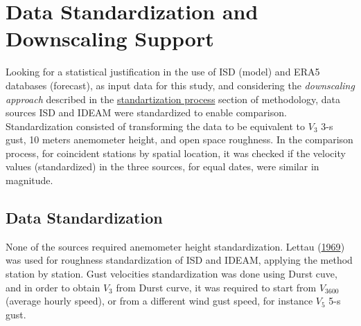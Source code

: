 \documentclass[12pt,oneside]{reedthesis}
\begin{document}
\hypertarget{data-standardization-and-downscaling-support}{%
\section{Data Standardization and Downscaling Support}\label{data-standardization-and-downscaling-support}}

Looking for a statistical justification in the use of ISD (model) and ERA5 databases (forecast), as input data for this study, and considering the \emph{downscaling approach} described in the \protect\hyperlink{rmd-standartization}{standartization process} section of methodology, data sources ISD and IDEAM were standardized to enable comparison. Standardization consisted of transforming the data to be equivalent to \(V_3\) 3-s gust, 10 meters anemometer height, and open space roughness. In the comparison process, for coincident stations by spatial location, it was checked if the velocity values (standardized) in the three sources, for equal dates, were similar in magnitude.

\hypertarget{data-standardization-1}{%
\subsection{Data Standardization}\label{data-standardization-1}}

None of the sources required anemometer height standardization. Lettau (\protect\hyperlink{ref-Lettau1969}{1969}) was used for roughness standardization of ISD and IDEAM, applying the method station by station. Gust velocities standardization was done using Durst cuve, and in order to obtain \(V_3\) from Durst curve, it was required to start from \(V_{3600}\) (average hourly speed), or from a different wind gust speed, for instance \(V_5\) 5-s gust.
\end{document}
